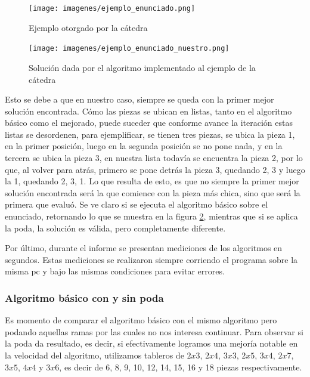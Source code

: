 \documentclass[11pt,a4paper]{article}
\begin{document}
	\begin{figure}[H]
    	\begin{center}
        	\texttt{[image: imagenes/ejemplo\_enunciado.png]}
    	\end{center}
    	\caption{Ejemplo otorgado por la cátedra}
    	\label{fig:ejemplo_enunciado}
	\end{figure}

	\begin{figure}[H]
    	\begin{center}
        	\texttt{[image: imagenes/ejemplo\_enunciado\_nuestro.png]}
    	\end{center}
    	\caption{Solución dada por el algoritmo implementado al ejemplo de la cátedra}
    	\label{fig:ejemplo_enunciado_nuestro}
	\end{figure}

Esto se debe a que en nuestro caso, siempre se queda con la primer mejor solución encontrada. Cómo las piezas se ubican en listas, tanto en el algoritmo básico como el mejorado, puede suceder que conforme avance la iteración estas listas se desordenen, para ejemplificar, se tienen tres piezas, se ubica la pieza 1, en la primer posición, luego en la segunda posición se no pone nada, y en la tercera se ubica la pieza 3, en nuestra lista todavía se encuentra la pieza 2, por lo que, al volver para atrás, primero se pone detrás la pieza 3, quedando 2, 3 y luego la 1, quedando 2, 3, 1. Lo que resulta de esto, es que no siempre la primer mejor solución encontrada será la que comience con la pieza más chica, sino que será la primera que evaluó. Se ve claro si se ejecuta el algoritmo básico sobre el enunciado, retornando lo que se muestra en la figura \ref{fig:ejemplo_enunciado_nuestro}, mientras que si se aplica la poda, la solución es válida, pero completamente diferente.

Por último, durante el informe se presentan mediciones de los algoritmos en segundos. Estas mediciones se realizaron siempre corriendo el programa sobre la misma pc y bajo las mismas condiciones para evitar errores.

\subsubsection*{Algoritmo básico con y sin poda}

Es momento de comparar el algoritmo básico con el mismo algoritmo pero podando aquellas ramas por las cuales no nos interesa continuar.
Para observar si la poda da resultado, es decir, si efectivamente logramos una mejoría notable en la velocidad del algoritmo, utilizamos tableros de $2x3$, $2x4$, $3x3$, $2x5$, $3x4$, $2x7$, $3x5$, $4x4$ y $3x6$, es decir de 6, 8, 9, 10, 12, 14, 15, 16 y 18 piezas respectivamente.
\end{document}
